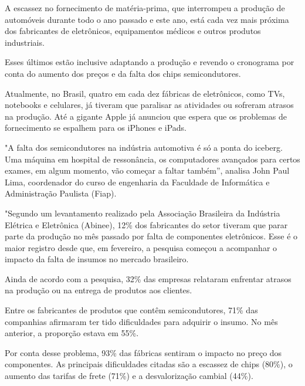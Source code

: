     \begin{citacao}
        A escassez no fornecimento de matéria-prima, que interrompeu a produção de automóveis durante todo o ano passado e este ano, está cada vez mais próxima dos fabricantes de eletrônicos, equipamentos médicos e outros produtos industriais.
        
        Esses últimos estão inclusive adaptando a produção e revendo o cronograma por conta do aumento dos preços e da falta dos chips semicondutores.
        
        Atualmente, no Brasil, quatro em cada dez fábricas de eletrônicos, como TVs, notebooks e celulares, já tiveram que paralisar as atividades ou sofreram atrasos na produção. Até a gigante Apple já anunciou que espera que os problemas de fornecimento se espalhem para os iPhones e iPads.
        
        "A falta dos semicondutores na indústria automotiva é só a ponta do iceberg. Uma máquina em hospital de ressonância, os computadores avançados para certos exames, em algum momento, vão começar a faltar também”, analisa John Paul Lima, coordenador do curso de engenharia da Faculdade de Informática e Administração Paulista (Fiap).
        
        "Segundo um levantamento realizado pela Associação Brasileira da Indústria Elétrica e Eletrônica (Abinee), 12\% dos fabricantes do setor tiveram que parar parte da produção no mês passado por falta de componentes eletrônicos. Esse é o maior registro desde que, em fevereiro, a pesquisa começou a acompanhar o impacto da falta de insumos no mercado brasileiro.
        
        Ainda de acordo com a pesquisa, 32\% das empresas relataram enfrentar atrasos na produção ou na entrega de produtos aos clientes.
        
        Entre os fabricantes de produtos que contêm semicondutores, 71\% das companhias afirmaram ter tido dificuldades para adquirir o insumo. No mês anterior, a proporção estava em 55\%.
        
        Por conta desse problema, 93\% das fábricas sentiram o impacto no preço dos componentes. As principais dificuldades citadas são a escassez de chips (80\%), o aumento das tarifas de frete (71\%) e a desvalorização cambial (44\%).
        \end{citacao}
        

        \break 

